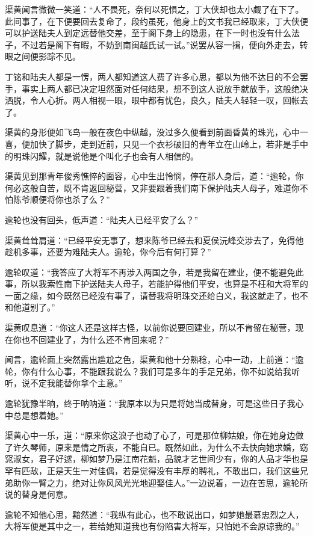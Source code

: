 渠黄闻言微微一笑道：“人不畏死，奈何以死惧之，丁大侠却也太小觑了在下了。此间事了，在下便要回去复命了，段约虽死，他身上的文书我已经取来，丁大侠便可以护送陆夫人到定远替他交差，至于阁下身上的隐患，在下一时也没有什么法子，不过若是阁下有暇，不妨到南闽越氏试一试。”说罢从容一揖，便向外走去，转眼之间便影踪不见。

丁铭和陆夫人都是一愣，两人都知道这人费了许多心思，都以为他不达目的不会罢手，事实上两人都已决定坦然面对任何结果，想不到这人说放手就放手，这般绝决洒脱，令人心折。两人相视一眼，眼中都有忧色，良久，陆夫人轻轻一叹，回帐去了。

渠黄的身形便如飞鸟一般在夜色中纵越，没过多久便看到前面昏黄的珠光，心中一喜，便加快了脚步，走到近前，只见一个衣衫破旧的青年立在山岭上，若非是手中的明珠闪耀，就是说他是个叫化子也会有人相信的。

渠黄见到那青年俊秀憔悴的面容，心中生出怜悯，停在那人身后，道：“逾轮，你何必这般自苦，既不肯返回秘营，又非要跟着我们南下保护陆夫人母子，难道你不怕陈爷顺便将你也杀了么？”

逾轮也没有回头，低声道：“陆夫人已经平安了么？”

渠黄耸耸肩道：“已经平安无事了，想来陈爷已经去和夏侯沅峰交涉去了，免得他趁机多事，还要为难陆夫人。逾轮，你今后有何打算？”

逾轮叹道：“我答应了大将军不再涉入两国之争，若是我留在建业，便不能避免此事，所以我索性南下护送陆夫人母子，若能护得他们平安，也算是不枉和大将军的一面之缘，如今既然已经没有事了，请替我将明珠交还给白义，我这就走了，也不和他道别了。”

渠黄叹息道：“你这人还是这样古怪，以前你说要回建业，所以不肯留在秘营，现在你也不回建业了，为什么还不肯回来呢？”

闻言，逾轮面上突然露出尴尬之色，渠黄和他十分熟稔，心中一动，上前道：“逾轮，你有什么心事，不能跟我说么？我们可是多年的手足兄弟，你不如说给我听听，说不定我能替你拿个主意。”

逾轮犹豫半晌，终于呐呐道：“我原本以为只是将她当成替身，可是这些日子我心中总是想着她。”

渠黄心中一乐，道：“原来你这浪子也动了心了，可是那位柳姑娘，你在她身边做了许久琴师，原来是情之所衷，不能自已。既然如此，为什么不去快向她求婚，窈窕淑女，君子好逑，柳如梦乃是江南花魁，品貌才艺世间少有，你的人品才华也是罕有匹敌，正是天生一对佳偶，若是觉得没有丰厚的聘礼，不敢出口，我们这些兄弟助你一臂之力，绝对让你风风光光地迎娶佳人。”一边说着，一边在苦思，逾轮所说的替身是何意。

逾轮不知他心思，黯然道：“我纵有此心，也不敢说出口，如梦她最慕忠烈之人，大将军便是其中之一，若给她知道我也有份陷害大将军，只怕她不会原谅我的。”

